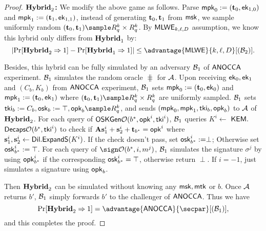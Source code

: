 \begin{proof}
\noindent\textbf{$\mathbf{Hybrid}_2$:} We modify the above game as follows. Parse $\mathsf{mpk}_0:=(\mathbf{t}_0,\mathsf{ek}_{1,0})$ and $\mathsf{mpk}_1:=(\mathbf{t}_1,\mathsf{ek}_{1,1})$, instead of generating $\mathbf{t}_0,\mathbf{t}_1$ from $\mathsf{msk}$, we sample uniformly random $(\tn_0,\tn_1)\sample R^k_q\times R^k_q$. 
By $\mathsf{MLWE}_{k,\ell,D}$ assumption, we know this hybrid only differs from $\mathbf{Hybrid}_1$ by:
$$\left| \Pr[\hyb_2\Rightarrow 1]-\Pr[\hyb_1\Rightarrow 1] \right| \le \advantage{\mlwe}{k,\ell,D}[(\Bc_2)].
$$

Besides, this hybrid can be fully simulated by an adversary $\mathcal{B}_1$ of $\mathsf{ANOCCA}$ experiment. $\mathcal{B}_1$ simulates the random oracle $\hash$ for $\mathcal{A}$. Upon receiving $\mathsf{ek}_0,\mathsf{ek}_1$ and $(C_b, K_b)$ from $\mathsf{ANOCCA}$ experiment, $\mathcal{B}_1$ sets $\mathsf{mpk}_0:=(\mathbf{t}_0,\mathsf{ek}_0)$ and $\mathsf{mpk}_1:=(\mathbf{t}_0,\mathsf{ek}_1)$ where $(\tn_0,\tn_1)\sample R^k_q\times R^k_q$ are uniformly sampled. $\mathcal{B}_1$ sets $\tki_b:=C_b, \osk_b:=\top, \opk_b\sample R^k_q$, and sends $(\mathsf{mpk}_0,\mathsf{mpk}_1,\mathsf{tki}_b,\mathsf{opk}_b)$ to $\mathcal{A}$ of $\mathbf{Hybrid}_2$.
For each query of $\mathsf{OSKGen}\mathcal{O}(b^*,\mathsf{opk}^i,\mathsf{tki}^i)$, $\mathcal{B}_1$ queries $K^i\gets$ $\mathsf{KEM}.$ $\mathsf{Decaps}\mathcal{O}(b^*, \mathsf{tki}^i)$ to check if $\mathbf{A}\mathbf{s}^i_1+\mathbf{s}^i_2+\mathbf{t}_{b^*}=\mathsf{opk}^i$ where $\mathbf{s}^i_1,\mathbf{s}^i_2\gets\mathsf{Dil}.\mathsf{ExpandS}(K^i)$. If the check doesn't pass, set $\mathsf{osk}^i_{b^*}:=\perp$; Otherwise set $\mathsf{osk}^i_{b^*}:=\top$.
For each query of $\sign\Oc(b^*,i,m^j)$, $\mathcal{B}_1$
simulates the signature $\sigma^j$ by using $\mathsf{opk}^i_{b^*}$ if the corresponding $\mathsf{osk}^i_{b^*}=\top$, otherwise return $\perp$. If $i=-1$, just simulates a signature using $\mathsf{opk}_b$.

Then $\mathbf{Hybrid}_2$ can be simulated without knowing any $\mathsf{msk},\mathsf{mtk}$ or $b$. Once $\mathcal{A}$ returns $b'$, $\mathcal{B}_1$ simply forwards $b'$ to the challenger of $\mathsf{ANOCCA}$.
Thus we have
$$\Pr[\hyb_2\Rightarrow 1] = \advantage{\anocca}{\secpar}[(\Bc_1)],
$$
and this completes the proof.
\end{proof}


